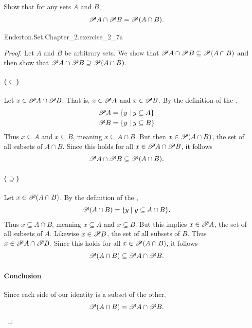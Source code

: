 \documentclass{report}
\begin{document}
\subsection{}%

  Show that for any sets $A$ and $B$,
    $$\mathscr{P}A \cap \mathscr{P}B = \mathscr{P}(A \cap B).$$

    {Enderton.Set.Chapter\_2.exercise\_2\_7a}

  \begin{proof}

    Let $A$ and $B$ be arbitrary sets. We show that
      $\mathscr{P}A \cap \mathscr{P}B \subseteq \mathscr{P}(A \cap B)$ and then
      show that
      $\mathscr{P}A \cap \mathscr{P}B \supseteq \mathscr{P}(A \cap B)$.

    \paragraph{($\subseteq$)}%

      Let $x \in \mathscr{P}A \cap \mathscr{P}B$.
      That is, $x \in \mathscr{P}A$ and $x \in \mathscr{P}B$.
      By the definition of the ,
        \begin{align*}
          \mathscr{P}A & = \{ y \mid y \subseteq A \} \\
          \mathscr{P}B & = \{ y \mid y \subseteq B \}
        \end{align*}
      Thus $x \subseteq A$ and $x \subseteq B$, meaning $x \subseteq A \cap B$.
      But then $x \in \mathscr{P}(A \cap B)$, the set of all subsets of
        $A \cap B$.
      Since this holds for all $x \in \mathscr{P}A \cap \mathscr{P}B$, it
        follows
        $$\mathscr{P}A \cap \mathscr{P}B \subseteq \mathscr{P}(A \cap B).$$

    \paragraph{($\supseteq$)}%

      Let $x \in \mathscr{P}(A \cap B)$.
      By the definition of the ,
        $$\mathscr{P}(A \cap B) = \{ y \mid y \subseteq A \cap B \}.$$
      Thus $x \subseteq A \cap B$, meaning $x \subseteq A$ and $x \subseteq B$.
      But this implies $x \in \mathscr{P}A$, the set of all subsets of $A$.
      Likewise $x \in \mathscr{P}B$, the set of all subsets of $B$.
      Thus $x \in \mathscr{P}A \cap \mathscr{P}B$.
      Since this holds for all $x \in \mathscr{P}(A \cap B)$, it follows
        $$\mathscr{P}(A \cap B) \subseteq \mathscr{P}A \cap \mathscr{P}B.$$

    \paragraph{Conclusion}%

      Since each side of our identity is a subset of the other,
        $$\mathscr{P}(A \cap B) = \mathscr{P}A \cap \mathscr{P}B.$$

  \end{proof}
\end{document}
